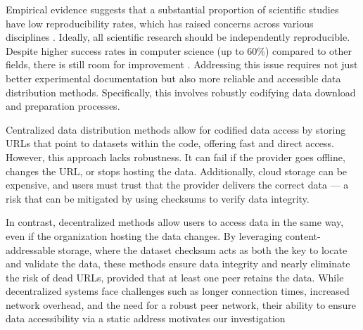 \documentclass[10pt,twocolumn,letterpaper]{article}
\begin{document}






Empirical evidence suggests that a substantial proportion of scientific studies have low reproducibility
  rates, which has raised concerns across various disciplines \cite{baker_reproducibility_2016}.
Ideally, all scientific research should be independently reproducible.
Despite higher success rates in computer science (up to 60\%) compared to other fields, there is still room for improvement
\cite{NEURIPS2019_c429429b, collberg2016repeatability, desai_what_2024}.
Addressing this issue requires not just better experimental documentation but also more reliable and
  accessible data distribution methods.
Specifically, this involves robustly codifying data download and preparation processes.


Centralized data distribution methods allow for codified data access by storing URLs that point to datasets
  within the code, offering fast and direct access.
However, this approach lacks robustness.
It can fail if the provider goes offline, changes the URL, or stops hosting the data.
Additionally, cloud storage can be expensive, and users must trust that the provider delivers the correct
  data --- a risk that can be mitigated by using checksums to verify data integrity.

In contrast, decentralized methods allow users to access data in the same way, even if the organization
  hosting the data changes.
By leveraging content-addressable storage, where the dataset checksum acts as both the key to locate and
  validate the data, these methods ensure data integrity and nearly eliminate the risk of dead URLs, provided
  that at least one peer retains the data.
While decentralized systems face challenges such as longer connection times, increased network overhead, and
  the need for a robust peer network, their ability to ensure data accessibility via a static address
  motivates our investigation
\end{document}
